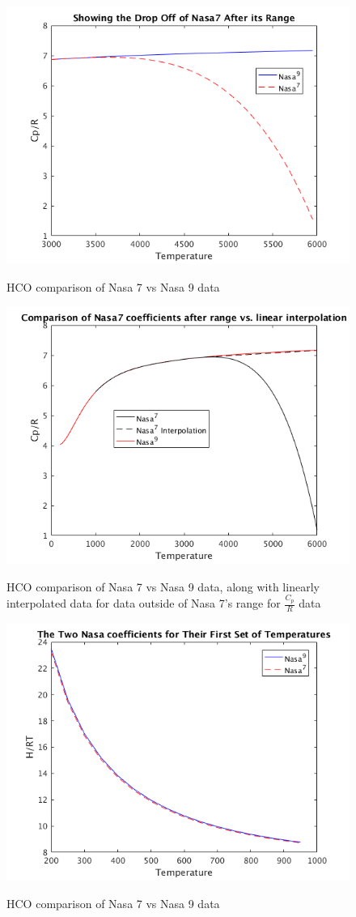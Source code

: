 \documentclass{article}
\begin{document}
\begin{figure}[!p]
  \centering
  \includegraphics[width=.8\linewidth]{./NasaPlots/Cp3.png}
  \label{fig:cp3}
  \caption{HCO comparison of Nasa 7 vs Nasa 9 data}
\end{figure}

 \begin{figure}[!p]
  \centering
  \includegraphics[width=.8\linewidth]{./NasaPlots/CpT.png}
  \label{fig:cpT}
  \caption{HCO comparison of Nasa 7 vs Nasa 9 data, along with linearly interpolated data for data outside of Nasa 7's range for $\frac{C_p}{R}$ data}
\end{figure}

\begin{figure}[!p]
  \centering
  \includegraphics[width=.8\linewidth]{./NasaPlots/H1.png}
  \label{fig:H1}
  \caption{HCO comparison of Nasa 7 vs Nasa 9 data}
\end{figure}
\end{document}
